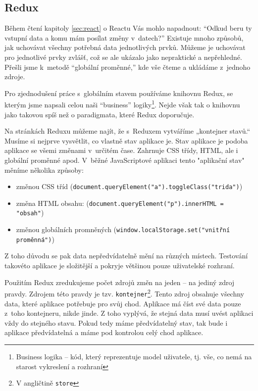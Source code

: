 \documentclass[a4paper,11pt,oneside]{article}
\begin{document}
\subsection{Redux}

Během čtení kapitoly \ref{sec:react} o Reactu Vás mohlo napadnout: \enquote{Odkud beru ty vstupní data a komu mám posílat změny v~datech?} Existuje mnoho způsobů, jak uchovávat všechny potřebná data jednotlivých prvků. Můžeme je uchovávat pro jednotlivé prvky zvlášť, což se ale ukázalo jako nepraktické a nepřehledné. Přešli jsme k~metodě \enquote{globální proměnné,} kde vše čteme a ukládáme z~jednoho zdroje.

Pro zjednodušení práce s~globálním stavem používáme knihovnu Redux, se kterým jsme napsali celou naši \enquote{business} logiky\footnote{Business logika -- kód, který reprezentuje model uživatele, tj. vše, co nemá na starost vykreslení a rozhraní}. Nejde však tak o knihovnu jako takovou spíš než o paradigmata, které Redux doporučuje.

Na stránkách Reduxu můžeme najít, že s~Reduxem vytváříme „kontejner stavů.“ Musíme si nejprve vysvětlit, co vlastně stav aplikace je. Stav aplikace je podoba aplikace se všemi změnami v~určitém čase. Zahrnuje CSS třídy, HTML, ale i globální proměnné apod. V~běžné JavaScriptové aplikaci tento "aplikační stav" měníme několika způsoby:

\begin{itemize}
	\item změnou CSS tříd (\lstinline|document.queryElement("a").toggleClass("trida")|)
	\item změna HTML obsahu: (\lstinline|document.queryElement("p").innerHTML = "obsah"|)
	\item změnou globálních promněných (\lstinline|window.localStorage.set("vnitřní proměnná")|)
\end{itemize}

Z toho důvodu se pak data nepředvídatelně mění na různých místech. Testování takovéto aplikace je složitější a pokryje většinou pouze uživatelské rozhraní. 

Použitím Redux zredukujeme počet zdrojů změn na jeden -- na jediný zdroj pravdy. Zdrojem této pravdy je tzv. \lstinline|kontejner|\footnote{V angličtině \lstinline|store|}. Tento zdroj obsahuje všechny data, které aplikace potřebuje pro svůj chod. Aplikace má číst své data pouze z~toho kontejneru, nikde jinde. Z toho vyplývá, že stejná data musí uvést aplikaci vždy do stejného stavu. Pokud tedy máme předvídatelný stav, tak bude i aplikace předvídatelná a máme pod kontrolou celý chod aplikace.
\end{document}
